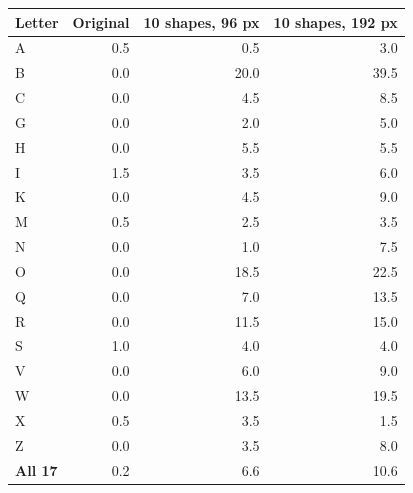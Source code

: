 
\begin{tabular}{lrrr}
\toprule
Letter & Original & 10 shapes, 96 px & 10 shapes, 192 px \\
\midrule
A & 0.5 & 0.5 & 3.0 \\
B & 0.0 & 20.0 & 39.5 \\
C & 0.0 & 4.5 & 8.5 \\
G & 0.0 & 2.0 & 5.0 \\
H & 0.0 & 5.5 & 5.5 \\
I & 1.5 & 3.5 & 6.0 \\
K & 0.0 & 4.5 & 9.0 \\
M & 0.5 & 2.5 & 3.5 \\
N & 0.0 & 1.0 & 7.5 \\
O & 0.0 & 18.5 & 22.5 \\
Q & 0.0 & 7.0 & 13.5 \\
R & 0.0 & 11.5 & 15.0 \\
S & 1.0 & 4.0 & 4.0 \\
V & 0.0 & 6.0 & 9.0 \\
W & 0.0 & 13.5 & 19.5 \\
X & 0.5 & 3.5 & 1.5 \\
Z & 0.0 & 3.5 & 8.0 \\
\midrule
\textbf{All 17} & 0.2 & 6.6 & 10.6 \\
\bottomrule
\end{tabular}
